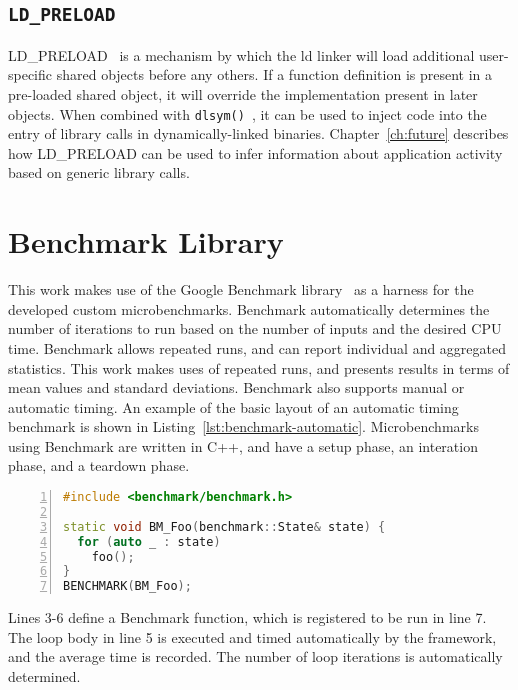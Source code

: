 \subsection{\texttt{LD\_PRELOAD}}
\label{sec:ldpreload}

LD\_PRELOAD~\cite{kerrisk2017ld} is a mechanism by which the ld linker will load additional user-specific shared objects before any others.
If a function definition is present in a pre-loaded shared object, it will override the implementation present in later objects.
When combined with \texttt{dlsym()}~\cite{kerrisk2017dlysm}, it can be used to inject code into the entry of library calls in dynamically-linked binaries.
Chapter~\ref{ch:future} describes how LD\_PRELOAD can be used to infer information about application activity based on generic library calls.


\section{Benchmark Library}
\label{sec:benchmark}

This work makes use of the Google Benchmark library~\cite{google2018benchmark} as a harness for the developed custom microbenchmarks.
Benchmark automatically determines the number of iterations to run based on the number of inputs and the desired CPU time.
Benchmark allows repeated runs, and can report individual and aggregated statistics.
This work makes uses of repeated runs, and presents results in terms of mean values and standard deviations.
Benchmark also supports manual or automatic timing.
An example of the basic layout of an automatic timing benchmark is shown in Listing~\ref{lst:benchmark-automatic}.
Microbenchmarks using Benchmark are written in C++, and have a setup phase, an interation phase, and a teardown phase.

\begin{lstlisting}[language=C++, caption=Benchmark with automatic timing., label=lst:benchmark-automatic, numbers=left]
#include <benchmark/benchmark.h>

static void BM_Foo(benchmark::State& state) {
  for (auto _ : state)
	foo();
}
BENCHMARK(BM_Foo);
\end{lstlisting}

Lines 3-6 define a Benchmark function, which is registered to be run in line 7.
The loop body in line 5 is executed and timed automatically by the framework, and the average time is recorded.
The number of loop iterations is automatically determined.


